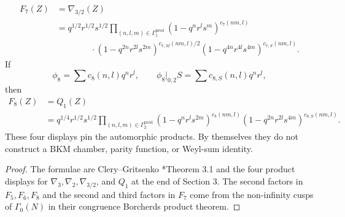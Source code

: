 \documentclass[11pt]{memoir}
\begin{document}
\begin{proposition}
$$\begin{aligned}
F_7(Z)&=\nabla_{3/2}(Z)\\
&=q^{1/2}r^{1/2}s^{1/2}
\prod_{(n,l,m)\in\Gamma_1^{\mathrm{prod}}}
(1-q^nr^ls^m)^{c_7(nm,l)}\\
&\qquad\qquad\cdot
(1-q^{2n}r^{2l}s^{2m})^{c_{7,M}(nm,l)/2}
(1-q^{4n}r^{4l}s^{4m})^{c_{7,S}(nm,l)}.
\end{aligned}
$$
If
$$
\phi_8=\sum c_8(n,l)q^nr^l,\qquad
\phi_8|_{0,2}S=\sum c_{8,S}(n,l)q^nr^l,
$$
then
$$
\begin{aligned}
F_8(Z)&=Q_1(Z)\\
&=q^{1/4}r^{1/2}s^{1/2}
\prod_{(n,l,m)\in\Gamma_2^{\mathrm{prod}}}
(1-q^nr^ls^{2m})^{c_8(nm,l)}
(1-q^{2n}r^{2l}s^{4m})^{c_{8,S}(nm,l)}.
\end{aligned}
$$
These four displays pin the automorphic products.  By themselves they
do not construct a BKM chamber, parity function, or Weyl-sum identity.
\end{proposition}

\begin{proof}
The formulae are Clery--Gritsenko \cite{GC}*{Theorem 3.1} and the four
product displays for $\nabla_3,\nabla_2,\nabla_{3/2}$, and $Q_1$ at
the end of Section 3.  The second factors in $F_5,F_6,F_8$ and the
second and third factors in $F_7$ come from the non-infinity cusps of
$\Gamma_0(N)$ in their congruence Borcherds product theorem.
\end{proof}
\end{document}
